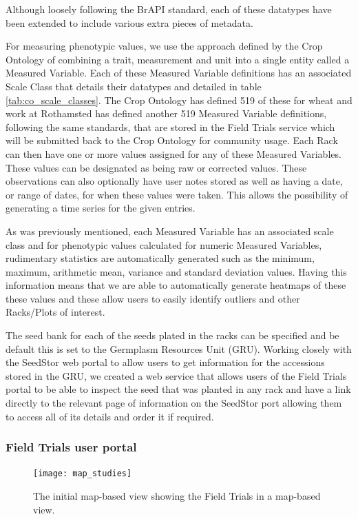 \documentclass[12pt,a4paper]{extarticle}
\begin{document}
Although loosely following the BrAPI standard, each of these datatypes have been extended to include various extra pieces of metadata. 

For measuring phenotypic values, we use the approach defined by the Crop Ontology of combining a trait, measurement and unit into a single entity called a Measured Variable. 
Each of these Measured Variable definitions has an associated Scale Class that details their datatypes \cite{co_scales} and detailed in table \ref{tab:co_scale_classes}.
The Crop Ontology has defined 519 of these for wheat\cite{co_variables} and work at Rothamsted has defined another 519 Measured Variable definitions, following the same standards, that are stored in the Field Trials service which will be submitted back to the Crop Ontology for community usage.
Each Rack can then have one or more values assigned for any of these Measured Variables. 
These values can be designated as being raw or corrected values. These observations can also optionally have user notes stored as well as having a date, or range of dates, for when these values were taken.
This allows the possibility of generating a time series for the given entries.

As was previously mentioned, each Measured Variable has an associated scale class and for phenotypic values calculated for numeric Measured Variables, rudimentary statistics are automatically generated such as the minimum, maximum, arithmetic mean, variance and standard deviation values. 
Having this information means that we are able to automatically generate heatmaps of these these values and these allow users to easily identify outliers and other Racks/Plots of interest. 

The seed bank for each of the seeds plated in the racks can be specified and be default this is set to the Germplasm Resources Unit (GRU). 
Working closely with the SeedStor web portal to allow users to get information for the accessions stored in the GRU, we created a web service that allows users of the Field Trials portal to be able to inspect the seed that was planted in any rack and have a link directly to the relevant page of information on the SeedStor port allowing them to access all of its details and order it if required. 

\subsubsection*{Field Trials user portal}

\begin{figure}[!hp]
\centering
\texttt{[image: map\_studies]}
\caption{\label{fig:map_studies}The initial map-based view showing the Field Trials in a map-based view.}
\end{figure}
\end{document}
